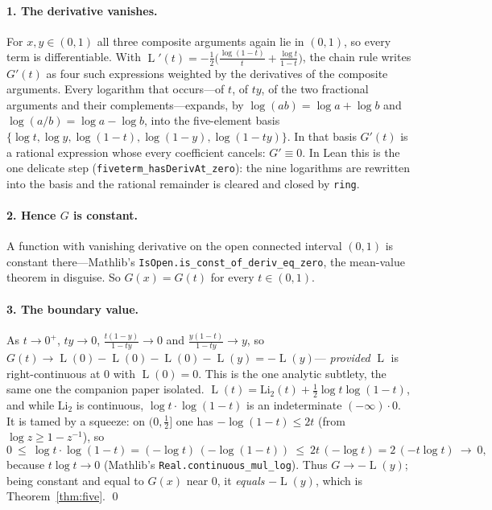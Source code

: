 \documentclass[11pt]{article}
\newcommand{\lean}[1]{\texttt{#1}}
\newcommand{\Li}{\mathrm{Li}_2}
\DeclareMathOperator{\Lrog}{L}
\begin{document}
\paragraph{1. The derivative vanishes.} For $x,y\in(0,1)$ all three composite arguments
again lie in $(0,1)$, so every term is differentiable. With $\Lrog'(t)=-\tfrac12\big(
\tfrac{\log(1-t)}{t}+\tfrac{\log t}{1-t}\big)$, the chain rule writes $G'(t)$ as four such
expressions weighted by the derivatives of the composite arguments. Every logarithm that
occurs---of $t$, of $ty$, of the two fractional arguments and their complements---expands,
by $\log(ab)=\log a+\log b$ and $\log(a/b)=\log a-\log b$, into the five-element basis
$\{\log t,\log y,\log(1-t),\log(1-y),\log(1-ty)\}$. In that basis $G'(t)$ is a rational
expression whose every coefficient cancels: $G'\equiv0$. In Lean this is the one delicate
step (\lean{fiveterm\_hasDerivAt\_zero}): the nine logarithms are rewritten into the basis
and the rational remainder is cleared and closed by \lean{ring}.

\paragraph{2. Hence $G$ is constant.} A function with vanishing derivative on the open
connected interval $(0,1)$ is constant there---Mathlib's
\lean{IsOpen.is\_const\_of\_deriv\_eq\_zero}, the mean-value theorem in disguise. So
$G(x)=G(t)$ for every $t\in(0,1)$.

\paragraph{3. The boundary value.} As $t\to0^+$, $ty\to0$, $\tfrac{t(1-y)}{1-ty}\to0$ and
$\tfrac{y(1-t)}{1-ty}\to y$, so $G(t)\to\Lrog(0)-\Lrog(0)-\Lrog(0)-\Lrog(y)=-\Lrog(y)$---%
\emph{provided} $\Lrog$ is right-continuous at $0$ with $\Lrog(0)=0$. This is the one
analytic subtlety, the same one the companion paper isolated. $\Lrog(t)=\Li(t)+\tfrac12\log
t\log(1-t)$, and while $\Li$ is continuous, $\log t\cdot\log(1-t)$ is an indeterminate
$(-\infty)\cdot 0$. It is tamed by a squeeze: on $(0,\tfrac12]$ one has $-\log(1-t)\le 2t$
(from $\log z\ge1-z^{-1}$), so
\[
  0\ \le\ \log t\cdot\log(1-t)=(-\log t)\,(-\log(1-t))\ \le\ 2t\,(-\log t)=2\,(-t\log t)
  \ \longrightarrow\ 0,
\]
because $t\log t\to0$ (Mathlib's \lean{Real.continuous\_mul\_log}). Thus $G\to-\Lrog(y)$;
being constant and equal to $G(x)$ near $0$, it \emph{equals} $-\Lrog(y)$, which is
Theorem~\ref{thm:five}. \qed
\end{document}
